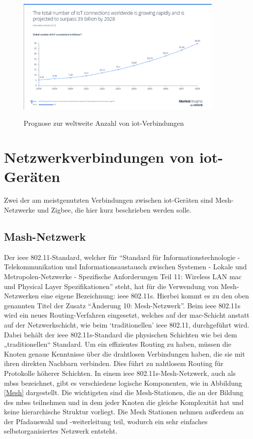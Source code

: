 \documentclass[12pt, a4paper, onecolumn, oneside, toc=bibliographynumbered, liststotoc]{scrreprt} %
\begin{document}
\begin{figure}[H]
	\centering
	\caption{Prognose zur weltweite Anzahl von \ac{iot}-Verbindungen} %
	\includegraphics[width=0.9\textwidth]{Statista_iot.png}
	\label{IoT-Verbindungen}
\end{figure}



	\chapter{Netzwerkverbindungen von \ac{iot}-Geräten}
Zwei der am meistgenutzten Verbindungen zwischen \ac{iot}-Geräten sind Mesh-Netzwerke und Zigbee, die hier kurz beschrieben werden solle.
    
		\section{Mash-Netzwerk}
Der \ac{ieee} 802.11-Standard, welcher für \enquote{Standard für Informationstechnologie - Telekommunikation und Informationsaustausch zwischen Systemen - Lokale und Metropolen-Netzwerke - Spezifische Anforderungen Teil 11: Wireless LAN \ac{mac} und Physical Layer Spezifikationen} steht, hat für die Verwendung von Mesh-Netzwerken eine eigene Bezeichnung: \ac{ieee} 802.11s. Hierbei kommt es zu den oben genannten Titel der Zusatz \enquote{Änderung 10: Mesh-Netzwerk}. Beim \ac{ieee} 802.11s wird ein neues Routing-Verfahren eingesetzt, welches auf der \ac{mac}-Schicht anstatt auf der Netzwerkschicht, wie beim \enquote*{traditionellen} \ac{ieee} 802.11, durchgeführt wird. Dabei behält der \ac{ieee} 802.11s-Standard die physischen Schichten wie bei dem „traditionellen“ Standard. Um ein effizientes Routing zu haben, müssen die Knoten genaue Kenntnisse über die drahtlosen Verbindungen haben, die sie mit ihren direkten Nachbarn verbinden. Dies führt zu nahtlosem Routing für Protokolle höherer Schichten. In einem \ac{ieee} 802.11s-Mesh-Netzwerk, auch als \ac{mbss} bezeichnet, gibt es verschiedene logische Komponenten, wie in Abbildung \ref{Mesh} dargestellt. Die wichtigsten sind die Mesh-Stationen, die an der Bildung des \ac{mbss} teilnehmen und in dem jeder Knoten die gleiche Komplexität hat und keine hierarchische Struktur vorliegt. Die Mesh Stationen nehmen außerdem an der Pfadauswahl und -weiterleitung teil, wodurch ein sehr einfaches selbstorganisiertes Netzwerk entsteht.
\end{document}
